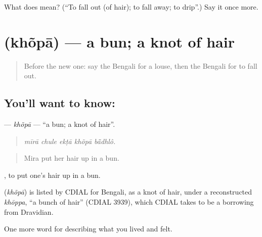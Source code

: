 \begin{tcolorbox}[breakable,colback=teal!4,colframe=teal!35!black,title={Before you move on}]
What does  mean? (\textquotedblleft{}To fall out (of hair); to fall away; to drip\textquotedblright{}.) Say it once more.
\end{tcolorbox}
\section[\texorpdfstring{\bn{খোঁপা} (khõpā)}{খোঁপা (khõpā)}]{ (khõpā) — a bun; a knot of hair}

\label{lesson:BN-C470-khopa}



\begin{quote}
Before the new one: say the Bengali for a louse, then the Bengali for to fall out.
\end{quote}

\subsection*{You'll want to know: }
\textbf{} — \emph{khõpā} — \textquotedblleft{}a bun; a knot of hair\textquotedblright{}.

\begin{quote}
    
\end{quote}

\begin{quote}
\emph{mīrā chule ekṭā khõpā bā̃dhlô.}
\end{quote}

\begin{quote}
Mira put her hair up in a bun.
\end{quote}

 , to put one's hair up in a bun.

\begin{cousinweb}
\textbf{} (\emph{khõpā}) is listed by CDIAL for Bengali, as a knot of hair, under a reconstructed \emph{khōppa}, \textquotedblleft{}a bunch of hair\textquotedblright{} (CDIAL 3939), which CDIAL takes to be a borrowing from Dravidian.
\end{cousinweb}

\begin{grammarlens}[title={What you've built}]
One more word for describing what you lived and felt.
\end{grammarlens}

